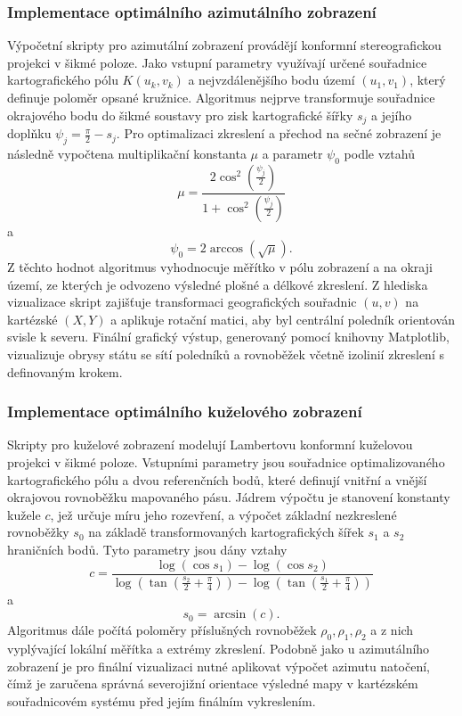 \documentclass[12pt]{article}
\begin{document}
\subsubsection*{Implementace optimálního azimutálního zobrazení}
Výpočetní skripty pro azimutální zobrazení provádějí konformní stereografickou projekci v šikmé poloze. Jako vstupní parametry využívají určené souřadnice kartografického pólu $K(u_k, v_k)$ a nejvzdálenějšího bodu území $(u_1, v_1)$, který definuje poloměr opsané kružnice. Algoritmus nejprve transformuje souřadnice okrajového bodu do šikmé soustavy pro zisk kartografické šířky $s_j$ a jejího doplňku $\psi_j = \frac{\pi}{2} - s_j$. Pro optimalizaci zkreslení a přechod na sečné zobrazení je následně vypočtena multiplikační konstanta $\mu$ a parametr $\psi_0$ podle vztahů
$$\mu = \frac{2 \cos^2\left(\frac{\psi_j}{2}\right)}{1 + \cos^2\left(\frac{\psi_j}{2}\right)}$$
a
$$\psi_0 = 2 \arccos(\sqrt{\mu}).$$
Z těchto hodnot algoritmus vyhodnocuje měřítko v pólu zobrazení a na okraji území, ze kterých je odvozeno výsledné plošné a délkové zkreslení. Z hlediska vizualizace skript zajišťuje transformaci geografických souřadnic $(u, v)$ na kartézské $(X, Y)$ a aplikuje rotační matici, aby byl centrální poledník orientován svisle k severu. Finální grafický výstup, generovaný pomocí knihovny Matplotlib, vizualizuje obrysy státu se sítí poledníků a rovnoběžek včetně izolinií zkreslení s definovaným krokem.

\subsubsection*{Implementace optimálního kuželového zobrazení}
Skripty pro kuželové zobrazení modelují Lambertovu konformní kuželovou projekci v šikmé poloze. Vstupními parametry jsou souřadnice optimalizovaného kartografického pólu a dvou referenčních bodů, které definují vnitřní a vnější okrajovou rovnoběžku mapovaného pásu. Jádrem výpočtu je stanovení konstanty kužele $c$, jež určuje míru jeho rozevření, a výpočet základní nezkreslené rovnoběžky $s_0$ na základě transformovaných kartografických šířek $s_1$ a $s_2$ hraničních bodů. Tyto parametry jsou dány vztahy
$$c = \frac{\log(\cos s_1) - \log(\cos s_2)}{\log\left(\tan\left(\frac{s_2}{2} + \frac{\pi}{4}\right)\right) - \log\left(\tan\left(\frac{s_1}{2} + \frac{\pi}{4}\right)\right)}$$
a
$$s_0 = \arcsin(c).$$
Algoritmus dále počítá poloměry příslušných rovnoběžek $\rho_0, \rho_1, \rho_2$ a z nich vyplývající lokální měřítka a extrémy zkreslení. Podobně jako u azimutálního zobrazení je pro finální vizualizaci nutné aplikovat výpočet azimutu natočení, čímž je zaručena správná severojižní orientace výsledné mapy v kartézském souřadnicovém systému před jejím finálním vykreslením.
\end{document}
